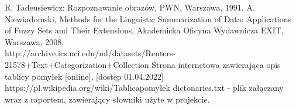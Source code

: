 \documentclass{classrep}
\begin{document}
\begin{thebibliography}{0}
 R. Tadeusiewicz: Rozpoznawanie obrazów, PWN, Warszawa, 1991.  
 A. Niewiadomski, Methods for the Linguistic Summarization of Data: Applications of Fuzzy Sets and Their Extensions, Akademicka Oficyna Wydawnicza EXIT, Warszawa, 2008.
  \\ 
http://archive.ics.uci.edu/ml/datasets/Reuters-21578+Text+Categorization+Collection
 Strona internetowa zawierająca opis tablicy pomyłek [online], [dostęp 01.04.2022] https://pl.wikipedia.org/wiki/Tablica\textunderscore pomyłek
 dictonaries.txt - plik załączany wraz z raportem, zawierający słowniki użyte w projekcie.
\end{thebibliography}

\end{document}
